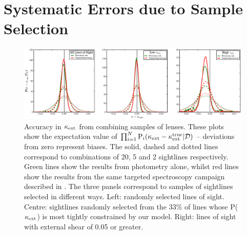 \documentclass[useAMS,usenatbib,a4paper]{mn2e}
\begin{document}

\section{Systematic Errors due to Sample Selection}
\label{sec:biases}

\begin{figure}
\includegraphics[width=\textwidth]{figs/biasplots.eps}
\caption{Accuracy in $\kappa_{\rm ext}$ from combining samples of lenses.  These plots
show the expectation value of $\prod_{i=1}^N {\rm P}_i(\kappa_{\rm ext}-\kappa_{\rm ext}^{\rm true}|{\mathcal{D}})$ --
deviations from zero represent biases. The solid, dashed and dotted lines
correspond to combinations of  20, 5 and 2 sightlines respectively. Green
lines show the results \infered from photometry alone, whilst red lines show
the results  from the same targeted spectroscopy campaign described in 
. The three panels correspond to samples of
sightlines selected in different ways. Left: randomly selected lines of
sight.  Centre: sightlines randomly selected from the 33\% of lines whose
P($\kappa_{\rm ext}$) is most tightly constrained by our model.  Right: lines of sight
with external shear of 0.05 or greater.}
\label{fig:biasplots}
\end{figure}
\end{document}
